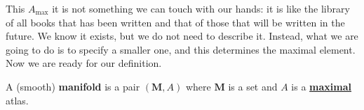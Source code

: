 \documentclass[../main.tex]{subfiles}
\begin{document}
This $A_{\textrm{max}}$ it is not something we can touch with our hands: it is like the library of all books that has been written and that of those that will be written in the future. We know it exists, but we do not need to describe it. Instead, what we are going to do is to specify a smaller one, and this determines the maximal element. Now we are ready for our definition.
\begin{definition}
A (smooth) \textbf{manifold}  is a pair $(\mathbf{M},A)$ where $\mathbf{M}$ is a set and $A$ is a \underline{\textbf{maximal}} atlas.
\end{definition}
\end{document}
